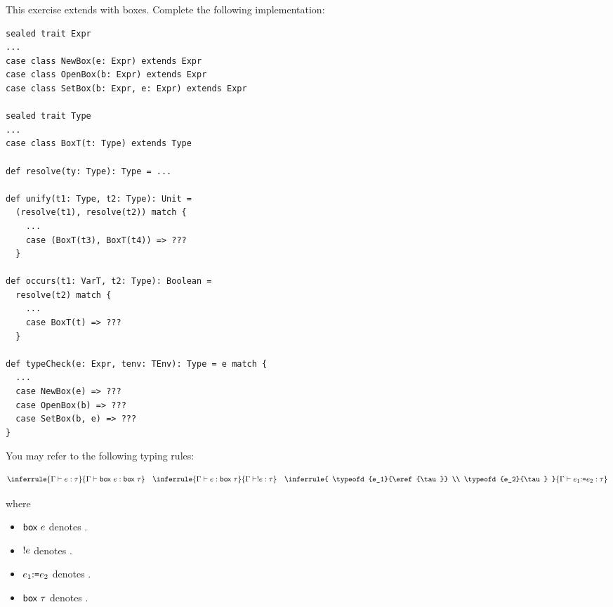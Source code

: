 \begin{exercise}

This exercise extends \Lang with boxes. Complete the following implementation:
\begin{verbatim}
sealed trait Expr
...
case class NewBox(e: Expr) extends Expr
case class OpenBox(b: Expr) extends Expr
case class SetBox(b: Expr, e: Expr) extends Expr

sealed trait Type
...
case class BoxT(t: Type) extends Type

def resolve(ty: Type): Type = ...

def unify(t1: Type, t2: Type): Unit =
  (resolve(t1), resolve(t2)) match {
    ...
    case (BoxT(t3), BoxT(t4)) => ???
  }

def occurs(t1: VarT, t2: Type): Boolean =
  resolve(t2) match {
    ...
    case BoxT(t) => ???
  }

def typeCheck(e: Expr, tenv: TEnv): Type = e match {
  ...
  case NewBox(e) => ???
  case OpenBox(b) => ???
  case SetBox(b, e) => ???
}
\end{verbatim}

You may refer to the following typing rules:

\[
    \inferrule
    { \typeofd{e}{\tau} }
    { \typeofd{\eref{e}}{\eref{\tau}} }
    \quad
    \inferrule
    { \typeofd{e}{\eref{\tau}} }
    { \typeofd{\ederef{e}}{\tau} }
    \quad
    \inferrule
    { \typeofd{e_1}{\eref{\tau}} \\
      \typeofd{e_2}{\tau} }
    { \typeofd{\eset{e_1}{e_2}}{\tau} }
\]

where

\begin{itemize}
  \item $\textsf{box}\ e$ denotes .
  \item $!e$ denotes .
  \item $e_1{:}\texttt{=} e_2$ denotes .
  \item $\textsf{box}\ \tau$ denotes .
\end{itemize}

\end{exercise}

